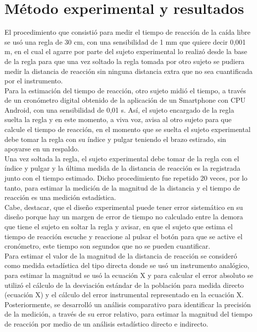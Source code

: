 \documentclass[runningheads]{llncs}
\begin{document}
    \section*{\centering Método experimental y resultados}
    
    El procedimiento que consistió para medir el tiempo de reacción de la caída libre se usó una regla de 30 cm, con una sensibilidad de 1 mm que quiere decir 0,001 m, en el cual el agarre por parte del sujeto experimental lo realizó desde la base de la regla para que una vez soltado la regla tomada por otro sujeto se pudiera medir la distancia de reacción sin ninguna distancia extra que no sea cuantificada por el instrumento. \\
    \linebreak
    Para la estimación del tiempo de reacción, otro sujeto midió el tiempo, a través de un cronómetro digital obtenido de la aplicación de un Smartphone con CPU Android, con una sensibilidad de 0,01 s. Así, el sujeto encargado de la regla suelta la regla y en este momento, a viva voz, avisa al otro sujeto para que calcule el tiempo de reacción, en el momento que se suelta el sujeto experimental debe tomar la regla con su índice y pulgar teniendo el brazo estirado, sin apoyarse en un respaldo. \\
    \linebreak
    Una vez soltada la regla, el sujeto experimental debe tomar de la regla con el índice y pulgar y la última medida de la distancia de reacción es la registrada junto con el tiempo estimado. Dicho procedimiento fue repetido 20 veces, por lo tanto, para estimar la medición de la magnitud de la distancia y el tiempo de reacción es una medición estadística. \\
    \linebreak
    Cabe, destacar, que el diseño experimental puede tener error sistemático en su diseño porque hay un margen de error de tiempo no calculado entre la demora que tiene el sujeto en soltar la regla y avisar, en que el sujeto que estima el tiempo de reacción escuche y reaccione al pulsar el botón para que se active el cronómetro, este tiempo son segundos que no se pueden cuantificar. \\
    \linebreak
    Para estimar el valor de la magnitud de la distancia de reacción se consideró como medida estadística del tipo directa donde se usó un instrumento analógico, para estimar la magnitud se usó la ecuación X y para calcular el error absoluto se utilizó el cálculo de la desviación estándar de la población para medida directo (ecuación X) y el cálculo del error instrumental representado en la ecuación X. \\
    \linebreak
    Posteriormente, se desarrolló un análisis comparativo para identificar la precisión de la medición, a través de su error relativo, para estimar la magnitud del tiempo de reacción por medio de un análisis estadístico directo e indirecto. \\
    \linebreak
\end{document}
